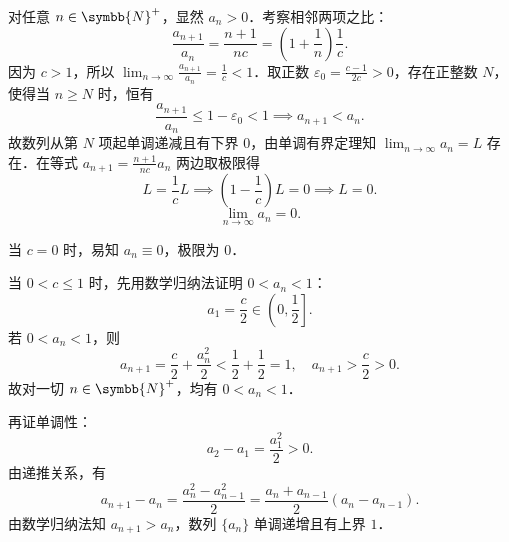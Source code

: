 \begin{solution}

    对任意 $n \in \symbb{N}^+$，显然 $a_n > 0$．考察相邻两项之比：
    \begin{equation}
        \frac{a_{n+1}}{a_n} = \frac{n+1}{n c} = \left( 1 + \frac{1}{n} \right) \frac{1}{c}.
    \end{equation}
    因为 $c > 1$，所以 $\lim_{n\to\infty} \frac{a_{n+1}}{a_n} = \frac{1}{c} < 1$．取正数 $\varepsilon_0 = \frac{c - 1}{2c} > 0$，存在正整数 $N$，使得当 $n \geqslant N$ 时，恒有
    \begin{equation}
        \frac{a_{n+1}}{a_n} \leqslant 1 - \varepsilon_0 < 1 \implies a_{n+1} < a_n.
    \end{equation}
    故数列从第 $N$ 项起单调递减且有下界 $0$，由单调有界定理知 $\lim_{n\to\infty} a_n = L$ 存在．在等式 $a_{n+1} = \frac{n+1}{n c} a_n$ 两边取极限得
    \begin{equation}
        L = \frac{1}{c} L \implies \left( 1 - \frac{1}{c} \right) L = 0 \implies L = 0.
    \end{equation}
    \begin{equation}
        \boxed{\lim_{n\to\infty} a_n = 0.}
    \end{equation}


    当 $c = 0$ 时，易知 $a_n \equiv 0$，极限为 $0$．

    当 $0 < c \leqslant 1$ 时，先用数学归纳法证明 $0 < a_n < 1$：
    \begin{equation}
        a_1 = \frac{c}{2} \in \left( 0, \frac{1}{2} \right].
    \end{equation}
    若 $0 < a_n < 1$，则
    \begin{equation}
        a_{n+1} = \frac{c}{2} + \frac{a_n^2}{2} < \frac{1}{2} + \frac{1}{2} = 1, \quad a_{n+1} > \frac{c}{2} > 0.
    \end{equation}
    故对一切 $n \in \symbb{N}^+$，均有 $0 < a_n < 1$．

    再证单调性：
    \begin{equation}
        a_2 - a_1 = \frac{a_1^2}{2} > 0.
    \end{equation}
    由递推关系，有
    \begin{equation}
        a_{n+1} - a_n = \frac{a_n^2 - a_{n-1}^2}{2} = \frac{a_n + a_{n-1}}{2} (a_n - a_{n-1}).
    \end{equation}
    由数学归纳法知 $a_{n+1} > a_n$，数列 $\{a_n\}$ 单调递增且有上界 $1$．


\end{solution}
